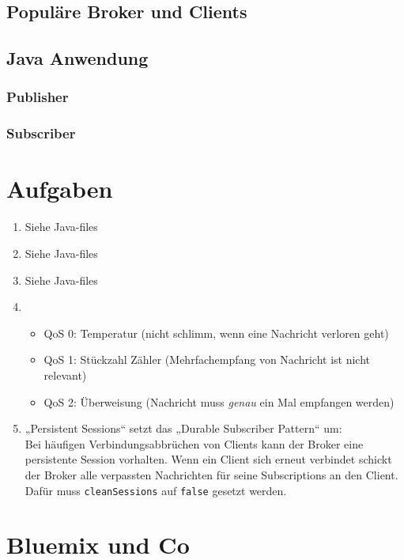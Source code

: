 \subsection{Populäre Broker und Clients}

\subsection{Java Anwendung}
\subsubsection{Publisher}
\subsubsection{Subscriber}

\section{Aufgaben}
\begin{enumerate}
\item Siehe Java-files
\item Siehe Java-files
\item Siehe Java-files
\item \begin{itemize}
\item QoS 0: Temperatur (nicht schlimm, wenn eine Nachricht verloren geht)
\item QoS 1: Stückzahl Zähler (Mehrfachempfang von Nachricht ist nicht relevant)
\item QoS 2: Überweisung (Nachricht muss \emph{genau} ein Mal empfangen werden)
\end{itemize}
\item „Persistent Sessions“ setzt das „Durable Subscriber Pattern“ um:\\
Bei häufigen Verbindungsabbrüchen von Clients kann der Broker eine persistente Session vorhalten. Wenn ein Client sich erneut verbindet schickt der Broker alle verpassten Nachrichten für seine Subscriptions an den Client.\\
Dafür muss \lstinline$cleanSessions$ auf \lstinline$false$ gesetzt werden.
\end{enumerate}

\section{Bluemix und Co}









